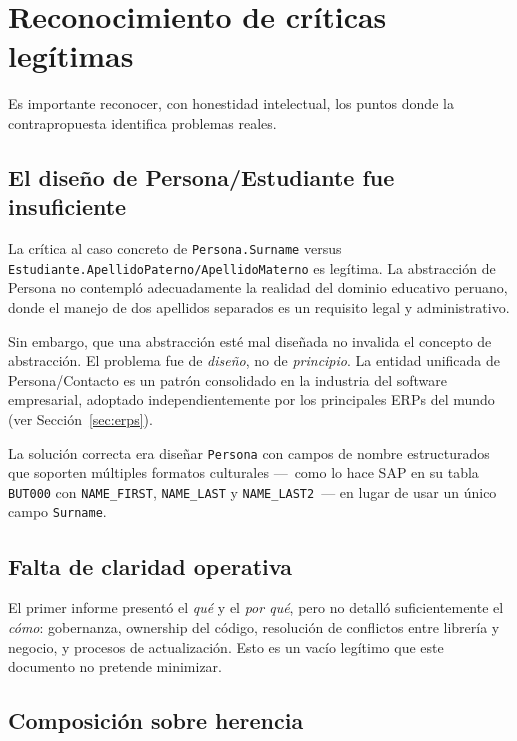 \documentclass[conference]{IEEEtran}
\begin{document}
\section{Reconocimiento de cr\'iticas leg\'itimas}

Es importante reconocer, con honestidad intelectual, los puntos
donde la contrapropuesta identifica problemas reales.

\subsection{El dise\~no de Persona/Estudiante fue insuficiente}

La cr\'itica al caso concreto de \texttt{Persona.Surname} versus
\texttt{Estudiante.ApellidoPaterno/ApellidoMaterno} es leg\'itima.
La abstracci\'on de Persona no contempl\'o adecuadamente la
realidad del dominio educativo peruano, donde el manejo de dos
apellidos separados es un requisito legal y administrativo.

Sin embargo, que una abstracci\'on est\'e mal dise\~nada no
invalida el concepto de abstracci\'on. El problema fue de
\textit{dise\~no}, no de \textit{principio}. La entidad unificada
de Persona/Contacto es un patr\'on consolidado en la industria del
software empresarial, adoptado independientemente por los
principales ERPs del mundo (ver Secci\'on~\ref{sec:erps}).

La soluci\'on correcta era dise\~nar \texttt{Persona} con campos
de nombre estructurados que soporten m\'ultiples formatos culturales
---~como lo hace SAP en su tabla \texttt{BUT000} con
\texttt{NAME\_FIRST}, \texttt{NAME\_LAST} y
\texttt{NAME\_LAST2}~--- en lugar de usar un \'unico campo
\texttt{Surname}.

\subsection{Falta de claridad operativa}

El primer informe present\'o el \textit{qu\'e} y el
\textit{por qu\'e}, pero no detall\'o suficientemente el
\textit{c\'omo}: gobernanza, ownership del c\'odigo, resoluci\'on
de conflictos entre librer\'ia y negocio, y procesos de
actualizaci\'on. Esto es un vac\'io leg\'itimo que este documento
no pretende minimizar.

\subsection{Composici\'on sobre herencia}
\end{document}
